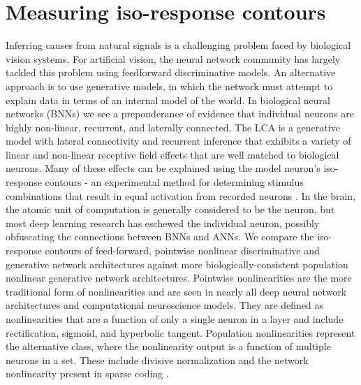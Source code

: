 \section{Measuring iso-response contours}\label{sec:ch4_iso_contours}
Inferring causes from natural signals is a challenging problem faced by biological vision systems.
For artificial vision, the neural network community has largely tackled this problem using feedforward discriminative models.
An alternative approach is to use generative models, in which the network must attempt to explain data in terms of an internal model of the world.
In biological neural networks (BNNs) we see a preponderance of evidence that individual neurons are highly non-linear, recurrent, and laterally connected.
The LCA is a generative model with lateral connectivity and recurrent inference that exhibits a variety of linear \parencite{olshausen1996emergence} and non-linear receptive field effects \parencite{zhu2013visual} that are well matched to biological neurons.
Many of these effects can be explained using the model neuron’s iso-response contours - an experimental method for determining stimulus combinations that result in equal activation from recorded neurons \parencite{golden2016conjectures}.
In the brain, the atomic unit of computation is generally considered to be the neuron, but most deep learning research has eschewed the individual neuron, possibly obfuscating the connections between BNNs and ANNs.
We compare the iso-response contours of feed-forward, pointwise nonlinear discriminative and generative network architectures against more biologically-consistent population nonlinear generative network architectures.
Pointwise nonlinearities are the more traditional form of nonlinearities and are seen in nearly all deep neural network architectures and computational neuroscience models.
They are defined as nonlinearities that are a function of only a single neuron in a layer and include rectification, sigmoid, and hyperbolic tangent.
Population nonlinearities represent the alternative class, where the nonlinearity output is a function of multiple neurons in a set.
These include divisive normalization \parencite{carandini2012normalization, balle2016end} and the network nonlinearity present in sparse coding \parencite{rozell2008sparse, olshausen1997sparse}.

